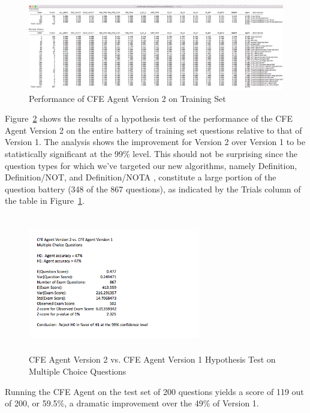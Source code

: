 \begin{figure}
\centering
\vspace{0.25in}
\includegraphics[width=\textwidth]{version_2_training_set_performance.png}
\caption{Performance of CFE Agent Version 2 on Training Set}
\label{fig:version_2_training_set_performance}
\end{figure}

Figure~\ref{fig:version_2_multiple_choice_hypothesis_test} shows the results of a hypothesis test of the performance of the CFE Agent Version 2 on the entire battery of training set questions relative to that of Version 1.  The analysis shows the improvement for Version 2 over Version 1 to be statistically significant at the 99\% level.  This should not be surprising since the question types for which we've targeted our new algorithms, namely Definition, Definition/NOT, and Definition/NOTA , constitute a large portion of the question battery (348 of the 867 questions), as indicated by the Trials column of the table in Figure~\ref{fig:version_2_training_set_performance}.

\begin{figure}
\centering
\vspace{0.75in}
\includegraphics[width=75mm, height=60mm]{version_2_multiple_choice_hypothesis_test.png}
\caption{CFE Agent Version 2 vs. CFE Agent Version 1 Hypothesis Test on Multiple Choice Questions}
\label{fig:version_2_multiple_choice_hypothesis_test}
\end{figure}

Running the CFE Agent on the test set of 200 questions yields a score of 119 out of 200, or 59.5\%, a dramatic improvement over the 49\% of Version 1.

















